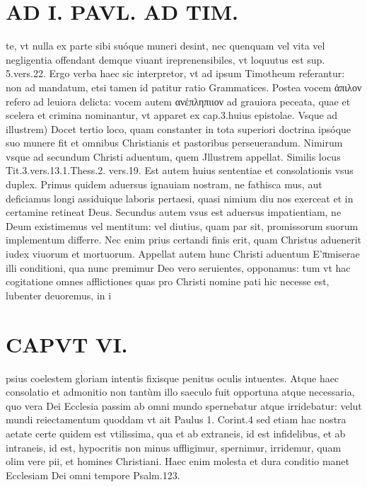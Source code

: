\documentclass{article}
\begin{document}
\begin{pages}
\section*{AD I. PAVL. AD TIM. }
\marginpar{[ p.310 ]}\pstart te, vt nulla ex parte sibi suóque muneri desint, nec quenquam vel vita vel negligentia offendant demque viuant ireprenensibiles, vt loquutus est sup. 5.vers.22.  \pend\pstart Ergo verba haec sic interpretor, vt ad ipsum Timotheum referantur: non ad mandatum, etsi tamen id patitur ratio Grammatices. Postea vocem ἀπιλον refero ad leuiora delicta: vocem autem ανέπληπιιον ad grauiora peceata, quae et scelera et crimina nominantur, vt apparet ex cap.3.huius epistolae.  \pend\pstart Vsque ad illustrem) Docet tertio loco, quam constanter in tota superiori doctrina ipsóque  suo munere fit et omnibus Christianis et pastoribus perseuerandum. Nimirum vsque ad secundum Christi aduentum, quem Jllustrem appellat. Similis locus Tit.3.vers.13.1.Thess.2. vers.19.  \pend\pstart Est autem huius sententiae et consolationis vsus duplex. Primus quidem aduersus ignauiam nostram, ne fathisca mus, aut deficiamus longi assiduique laboris pertaesi, quasi nimium diu nos exerceat et in certamine retineat Deus. Secundus autem vsus est aduersus impatientiam, ne Deum existimemus vel mentitum: vel diutius, quam par sit, promissorum suorum implementum differre. Nec enim prius certandi finis erit, quam Christus aduenerit iudex viuorum et mortuorum.  \pend\pstart Appellat autem hunc Christi aduentum E’πmiserae illi conditioni, qua nunc premimur Deo vero seruientes, opponamus: tum vt hac cogitatione omnes afflictiones quas pro Christi nomine pati hic necesse est, lubenter deuoremus, in i\pend
\section*{CAPVT  VI. }
\marginpar{[ p.17 ]}\pstart psius coelestem gloriam intentis fixisque penitus oculis intuentes. Atque haec consolatio et admonitio non tantùm illo saeculo fuit opportuna atque  necessaria, quo vera Dei Ecclesia passim ab omni mundo spernebatur atque irridebatur: velut mundi reiectamentum quoddam vt ait Paulus 1. Corint.4 sed etiam hac nostra aetate certe quidem est vtilissima, qua et ab extraneis, id est infidelibus, et ab intraneis, id est, hypocritis non minus uffligimur, spernimur, irridemur, quam olim vere pii, et homines Christiani. Haec enim molesta et dura conditio manet Ecclesiam Dei omni tempore Psalm.123.  \pend
{}
{}

\end{pages}
\end{document}
